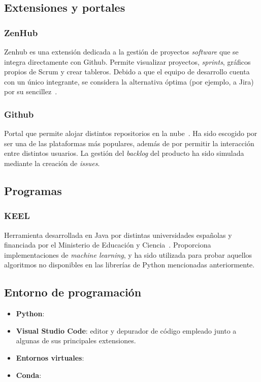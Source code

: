 \subsection{Extensiones y portales}

\subsubsection{ZenHub}

Zenhub es una extensión dedicada a la gestión de proyectos \textit{software} que se integra directamente con Github. Permite visualizar proyectos, \textit{sprints}, gráficos propios de Scrum y crear tableros. Debido a que el equipo de desarrollo cuenta con un único integrante, se considera la alternativa óptima (por ejemplo, a Jira) por su sencillez~\cite{zenhubHome}.

\subsubsection{Github}

Portal que permite alojar distintos repositorios en la nube~\cite{githubHome}. Ha sido escogido por ser una de las plataformas más populares, además de por permitir la interacción entre distintos usuarios. La gestión del \textit{backlog} del producto ha sido simulada mediante la creación de \textit{issues}.


\subsection{Programas}

\subsubsection{KEEL}

Herramienta desarrollada en Java por distintas universidades españolas y financiada por el Ministerio de Educación y Ciencia~\cite{keelRepo}. Proporciona implementaciones de \textit{machine learning}, y ha sido utilizada para probar aquellos algoritmos no disponibles en las librerías de Python mencionadas anteriormente.

\subsection{Entorno de programación}

\begin{itemize}
	\item \textbf{Python}:
	\item \textbf{Visual Studio Code}: editor y depurador de código empleado junto a algunas de sus principales extensiones.
	\item \textbf{Entornos virtuales}: 
	\item \textbf{Conda}:
\end{itemize}


